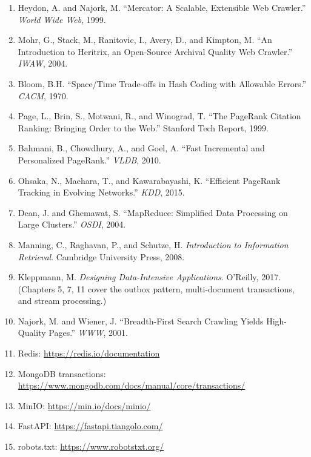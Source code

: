 \documentclass[11pt,a4paper]{article}
\begin{document}
\begin{enumerate}
  \item Heydon, A. and Najork, M. ``Mercator: A Scalable, Extensible Web Crawler.'' \emph{World Wide Web}, 1999.
  \item Mohr, G., Stack, M., Ranitovic, I., Avery, D., and Kimpton, M. ``An Introduction to Heritrix, an Open-Source Archival Quality Web Crawler.'' \emph{IWAW}, 2004.
  \item Bloom, B.H. ``Space/Time Trade-offs in Hash Coding with Allowable Errors.'' \emph{CACM}, 1970.
  \item Page, L., Brin, S., Motwani, R., and Winograd, T. ``The PageRank Citation Ranking: Bringing Order to the Web.'' Stanford Tech Report, 1999.
  \item Bahmani, B., Chowdhury, A., and Goel, A. ``Fast Incremental and Personalized PageRank.'' \emph{VLDB}, 2010.
  \item Ohsaka, N., Maehara, T., and Kawarabayashi, K. ``Efficient PageRank Tracking in Evolving Networks.'' \emph{KDD}, 2015.
  \item Dean, J. and Ghemawat, S. ``MapReduce: Simplified Data Processing on Large Clusters.'' \emph{OSDI}, 2004.
  \item Manning, C., Raghavan, P., and Schutze, H. \emph{Introduction to Information Retrieval}. Cambridge University Press, 2008.
  \item Kleppmann, M. \emph{Designing Data-Intensive Applications}. O'Reilly, 2017. (Chapters 5, 7, 11 cover the outbox pattern, multi-document transactions, and stream processing.)
  \item Najork, M. and Wiener, J. ``Breadth-First Search Crawling Yields High-Quality Pages.'' \emph{WWW}, 2001.
  \item Redis: \url{https://redis.io/documentation}
  \item MongoDB transactions: \url{https://www.mongodb.com/docs/manual/core/transactions/}
  \item MinIO: \url{https://min.io/docs/minio/}
  \item FastAPI: \url{https://fastapi.tiangolo.com/}
  \item robots.txt: \url{https://www.robotstxt.org/}
\end{enumerate}
\end{document}
